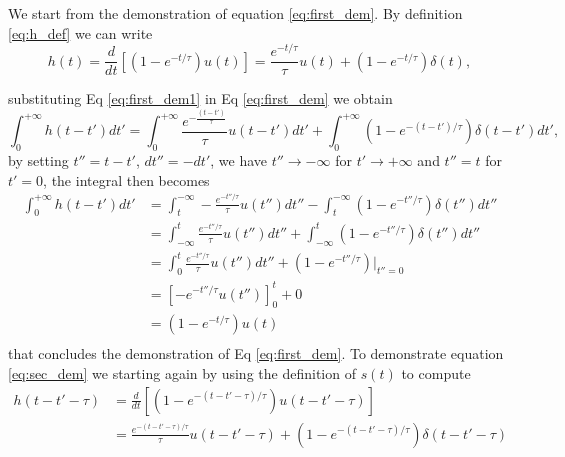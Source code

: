 We start from the demonstration of equation \ref{eq:first_dem}. By definition \ref{eq:h_def} we can write
\begin{equation}\label{eq:first_dem1}
    h(t) = \frac{d}{dt} \left[ \left(1 - e^{-t/\tau} \right) u(t) \right] = \frac{e^{-t/\tau}}{\tau} u(t) + \left(1 - e^{-t/\tau} \right) \delta(t), 
\end{equation}

substituting Eq \ref{eq:first_dem1} in Eq \ref{eq:first_dem} we obtain \begin{equation}
    \int_{0}^{+\infty} h(t - t') dt' = \int_{0}^{+\infty} \frac{e^{-\frac{(t - t')}{\tau}}}{\tau} u(t - t') dt' + \int_{0}^{+\infty} \left(1 - e^{-(t - t')/\tau} \right) \delta(t - t') dt',
\end{equation}
by setting $t'' = t-t'$, $dt''=-dt'$,  we have $t''\rightarrow -\infty$ for $t'\rightarrow +\infty$ and $t''= t$ for $t'= 0$, the integral then becomes
\begin{align}
    \int_{0}^{+\infty} h(t - t') dt' &= \int_{t}^{-\infty} -\frac{e^{-t''/\tau}}{\tau} u(t'') dt'' - \int_{t}^{-\infty} \left(1 - e^{-t''/\tau} \right) \delta(t'') dt'' \\
    &= \int_{-\infty}^{t} \frac{e^{-t''/\tau}}{\tau} u(t'') dt'' + \int_{-\infty}^{t} \left(1 - e^{-t''/\tau} \right) \delta(t'') dt''\\
    &= \int_{0}^{t} \frac{e^{-t''/\tau}}{\tau} u(t'') dt'' + \left(1 - e^{-t''/\tau} \right) \Big|_{t''=0}\\
    &= \left[ -e^{-t''/\tau} u(t'') \right]_{0}^{t} + 0\\
    &= (1 - e^{-t/\tau}) u(t)\\
\end{align}
that concludes the demonstration of Eq \ref{eq:first_dem}.
To demonstrate equation \ref{eq:sec_dem} we starting again by using the definition of $s(t)$ to compute 
\begin{align}
    h(t -t'-\tau) &= \frac{d}{dt} \left[ \left(1 - e^{-(t-t'-\tau)/\tau} \right) u(t-t'-\tau) \right] \\
    &= \frac{e^{-(t-t'-\tau)/\tau}}{\tau} u(t-t'-\tau) + \left(1 - e^{-(t-t'-\tau)/\tau} \right) \delta(t-t'-\tau)\\ \label{eq:sec_dem2}
\end{align}

